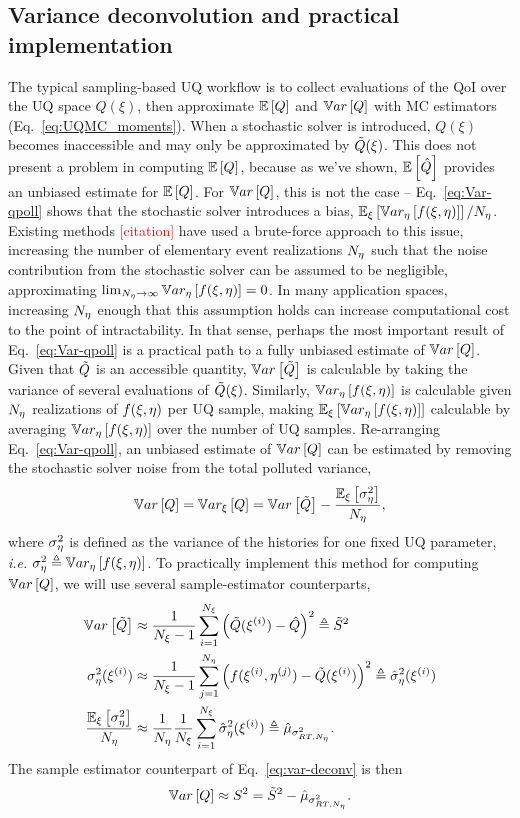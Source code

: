 \subsection{Variance deconvolution and practical implementation}
The typical sampling-based UQ workflow is to collect evaluations of the QoI over the UQ space $Q(\xi)$, then approximate $\mathbb{E}\left[Q\right]$ and $\mathbb{V}ar\left[Q\right]$ with MC estimators (Eq.~\eqref{eq:UQMC_moments}). When a stochastic solver is introduced, $Q(\xi)$ becomes inaccessible and may only be approximated by $\tilde{Q}(\xi)$. This does not present a problem in computing $\mathbb{E}\left[Q\right]$, because as we've shown, $\mathbb{E}\left[\hat{Q}\right]$ provides an unbiased estimate for $\mathbb{E}\left[Q\right]$. For $\mathbb{V}ar\left[Q\right]$, this is not the case -- Eq.~\eqref{eq:Var-qpoll} shows that the stochastic solver introduces a bias, $\mathbb{E}_\xi\left[\mathbb{V}ar_\eta\left[f(\xi,\eta)\right]\right]/{N_\eta}$. Existing methods \textcolor{red}{[citation]} have used a brute-force approach to this issue, increasing the number of elementary event realizations ${N_\eta}$ such that the noise contribution from the stochastic solver can be assumed to be negligible, approximating $\lim_{{N_\eta} \to \infty} \mathbb{V}ar_\eta\left[f(\xi,\eta)\right] = 0$. In many application spaces, increasing ${N_\eta}$ enough that this assumption holds can increase computational cost to the point of intractability. In that sense, perhaps the most important result of Eq.~\eqref{eq:Var-qpoll} is a practical path to a fully unbiased estimate of $\mathbb{V}ar\left[Q\right]$. Given that $\tilde{Q}$ is an accessible quantity, $\mathbb{V}ar\left[\tilde{Q}\right]$ is calculable by taking the variance of several evaluations of $\tilde{Q}(\xi)$. Similarly, $\mathbb{V}ar_\eta\left[f(\xi,\eta)\right]$ is calculable given ${N_\eta}$ realizations of $f(\xi,\eta)$ per UQ sample, making $\mathbb{E}_\xi\left[\mathbb{V}ar_\eta\left[f(\xi,\eta)\right]\right]$ calculable by averaging $\mathbb{V}ar_\eta\left[f(\xi,\eta)\right]$ over the number of UQ samples. Re-arranging Eq.~\eqref{eq:Var-qpoll}, an unbiased estimate of $\mathbb{V}ar\left[Q\right]$ can be estimated by removing the stochastic solver noise from the total polluted variance,
\begin{equation}\label{eq:var-deconv}
    \mathbb{V}ar\left[Q\right] = \mathbb{V}ar_\xi\left[Q\right] = \mathbb{V}ar\left[\tilde{Q}\right] - \frac{\mathbb{E}_\xi\left[\sigma^2_\eta\right]}{{N_\eta}} ,
\end{equation}
where $\sigma^2_\eta$ is defined as the variance of the histories for one fixed UQ parameter, \textit{i.e.} $\sigma^2_\eta \triangleq \mathbb{V}ar_\eta\left[f(\xi,\eta)\right]$. To practically implement this method for computing $\mathbb{V}ar\left[Q\right]$, we will use several sample-estimator counterparts,
\begin{equation}
    \begin{split}
        \mathbb{V}ar\left[\tilde{Q}\right] &\approx \frac{1}{{N_\xi}-1}\sum_{i=1}^{{N_\xi}}\left( \tilde{Q}(\xi^{(i)}) - \hat{Q} \right)^2 \triangleq \tilde{S}^2 \\
        \sigma^2_\eta(\xi^{(i)}) &\approx \frac{1}{{N_\xi}-1}\sum_{j=1}^{N_\eta}\left( f(\xi^{(i)},\eta^{(j)}) - \tilde{Q}(\xi^{(i)}) \right)^2 \triangleq \hat{\sigma}^2_\eta(\xi^{(i)}) \\
        \frac{\mathbb{E}_\xi\left[\sigma^2_\eta\right]}{{N_\eta}} &\approx \frac{1}{{N_\eta}} \frac{1}{{N_\xi}} \sum_{i=1}^{{N_\xi}} \hat{\sigma}^2_\eta(\xi^{(i)}) \triangleq \hat{\mu}_{\sigma^2_{RT,{N_\eta}}} .
    \end{split}
\end{equation}
The sample estimator counterpart of Eq.~\eqref{eq:var-deconv} is then
\begin{equation} \label{eq:sampling-var-deconv}
 \mathbb{V}ar\left[Q\right] \approx S^2 = \tilde{S}^2 - \hat{\mu}_{\sigma^2_{RT,{N_\eta}}}.
\end{equation}



